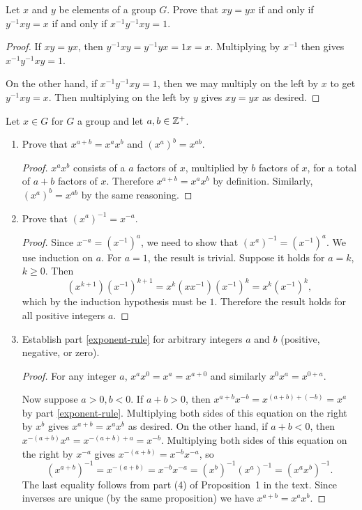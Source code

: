  Let $x$ and $y$ be elements of a group $G$. Prove that
$xy = yx$ if and only if $y^{-1}xy = x$ if and only if
$x^{-1}y^{-1}xy = 1$.
\begin{proof}
  If $xy = yx$, then $y^{-1}xy = y^{-1}yx = 1x = x$. Multiplying by
  $x^{-1}$ then gives $x^{-1}y^{-1}xy = 1$.

  On the other hand, if $x^{-1}y^{-1}xy = 1$, then we may multiply on
  the left by $x$ to get $y^{-1}xy = x$. Then multiplying on the left
  by $y$ gives $xy = yx$ as desired.
\end{proof}

 Let $x\in G$ for $G$ a group and let $a,b\in\mathbb{Z}^+$.
\begin{enumerate}
\item Prove that $x^{a+b} = x^ax^b$ and $(x^a)^b = x^{ab}$.
  \label{exponent-rule}
  \begin{proof}
    $x^ax^b$ consists of a $a$ factors of $x$, multiplied by $b$
    factors of $x$, for a total of $a+b$ factors of $x$. Therefore
    $x^{a+b} = x^ax^b$ by definition. Similarly, $(x^a)^b = x^{ab}$ by
    the same reasoning.
  \end{proof}
\item Prove that $(x^a)^{-1} = x^{-a}$.
  \begin{proof}
    Since $x^{-a} = (x^{-1})^a$, we need to show that
    $(x^a)^{-1} = (x^{-1})^a$. We use induction on $a$. For $a = 1$,
    the result is trivial. Suppose it holds for $a = k$,
    $k\geq0$. Then
    \begin{equation*}
      (x^{k+1})(x^{-1})^{k+1}
      = x^k(xx^{-1})(x^{-1})^k
      = x^k(x^{-1})^k,
    \end{equation*}
    which by the induction hypothesis must be $1$. Therefore the
    result holds for all positive integers $a$.
  \end{proof}
\item Establish part \ref{exponent-rule} for arbitrary integers $a$
  and $b$ (positive, negative, or zero).
  \begin{proof}
    For any integer $a$, $x^ax^0 = x^a = x^{a+0}$ and similarly
    $x^0x^a = x^{0+a}$.

    Now suppose $a>0,b<0$. If $a + b > 0$, then
    $x^{a+b}x^{-b} = x^{(a+b)+(-b)} = x^a$ by part
    \ref{exponent-rule}. Multiplying both sides of this equation on
    the right by $x^b$ gives $x^{a+b} = x^ax^b$ as desired. On the
    other hand, if $a + b < 0$, then
    $x^{-(a+b)}x^a = x^{-(a+b)+a} = x^{-b}$. Multiplying both sides of
    this equation on the right by $x^{-a}$ gives
    $x^{-(a+b)} = x^{-b}x^{-a}$, so
    \begin{equation*}
      (x^{a+b})^{-1}
      = x^{-(a+b)} = x^{-b}x^{-a} = (x^b)^{-1}(x^a)^{-1}
      = (x^ax^b)^{-1}.
    \end{equation*}
    The last equality follows from part (4) of Proposition~1 in the
    text. Since inverses are unique (by the same proposition) we have
    $x^{a+b} = x^ax^b$.


\end{proof}
\end{enumerate}

